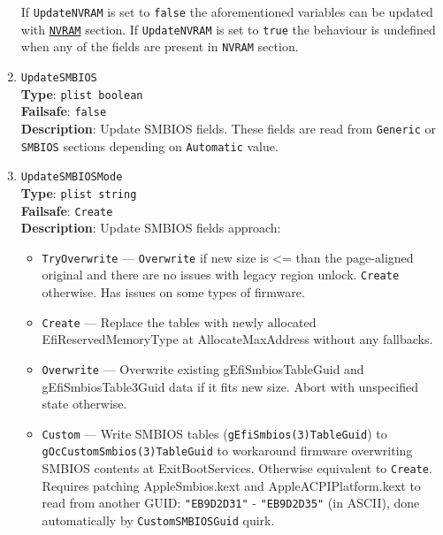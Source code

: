 \documentclass[]{article}
\providecommand{\tightlist}{%
  \setlength{\itemsep}{0pt}\setlength{\parskip}{0pt}}
\begin{document}
\begin{enumerate}
  If \texttt{UpdateNVRAM} is set to \texttt{false} the aforementioned
  variables can be updated with \hyperref[nvram]{\texttt{NVRAM}}
  section. If \texttt{UpdateNVRAM} is set to \texttt{true} the behaviour is
  undefined when any of the fields are present in \texttt{NVRAM} section.
\item
  \texttt{UpdateSMBIOS}\\
  \textbf{Type}: \texttt{plist\ boolean}\\
  \textbf{Failsafe}: \texttt{false}\\
  \textbf{Description}: Update SMBIOS fields. These fields are read from
  \texttt{Generic} or \texttt{SMBIOS} sections depending on
  \texttt{Automatic} value.
\item
  \texttt{UpdateSMBIOSMode}\\
  \textbf{Type}: \texttt{plist\ string}\\
  \textbf{Failsafe}: \texttt{Create}\\
  \textbf{Description}: Update SMBIOS fields approach:

  \begin{itemize}
  \tightlist
  \item
    \texttt{TryOverwrite} --- \texttt{Overwrite} if new size is \textless{}= than
    the page-aligned original and there are no issues with legacy region
    unlock. \texttt{Create} otherwise. Has issues on some types of firmware.
  \item
    \texttt{Create} --- Replace the tables with newly allocated
    EfiReservedMemoryType at AllocateMaxAddress without any fallbacks.
  \item
    \texttt{Overwrite} --- Overwrite existing gEfiSmbiosTableGuid and
    gEfiSmbiosTable3Guid data if it fits new size. Abort with
    unspecified state otherwise.
  \item
    \texttt{Custom} --- Write SMBIOS tables
    (\texttt{gEfiSmbios(3)TableGuid}) to \texttt{gOcCustomSmbios(3)TableGuid}
    to workaround firmware overwriting SMBIOS contents at
    ExitBootServices. Otherwise equivalent to \texttt{Create}. Requires
    patching AppleSmbios.kext and AppleACPIPlatform.kext to read from
    another GUID: \texttt{"EB9D2D31"} - \texttt{"EB9D2D35"} (in ASCII),
    done automatically by \texttt{CustomSMBIOSGuid} quirk.
  \end{itemize}


\end{enumerate}
\end{document}
